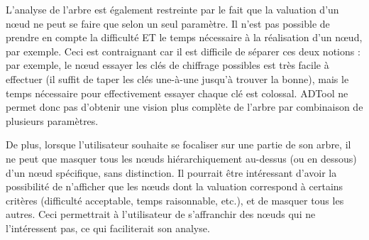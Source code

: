	L'analyse de l'arbre est également restreinte par le fait que la valuation d'un nœud ne peut se faire que selon un seul paramètre. Il n'est pas possible de prendre en compte la \og difficulté \fg{} ET le \og temps nécessaire \fg{} à la réalisation d'un nœud, par exemple. Ceci est contraignant car il est difficile de séparer ces deux notions : par exemple, le nœud \og essayer les clés de chiffrage possibles \fg{} est très facile à effectuer (il suffit de taper les clés une-à-une jusqu'à trouver la bonne), mais le temps nécessaire pour effectivement essayer chaque clé est colossal. ADTool ne permet donc pas d'obtenir une vision plus complète de l'arbre par combinaison de plusieurs paramètres. %
	
	 De plus, lorsque l'utilisateur souhaite se focaliser sur une partie de son arbre, il ne peut que masquer tous les nœuds hiérarchiquement au-dessus (ou en dessous) d'un nœud spécifique, %
	  sans distinction. Il pourrait être intéressant d'avoir la possibilité de n'afficher que les nœuds dont la valuation correspond à certains critères (difficulté acceptable, temps raisonnable, etc.), et de masquer tous les autres. Ceci permettrait à l'utilisateur de s'affranchir des nœuds qui ne l'intéressent pas, ce qui faciliterait son analyse.
	 
	 
	 

